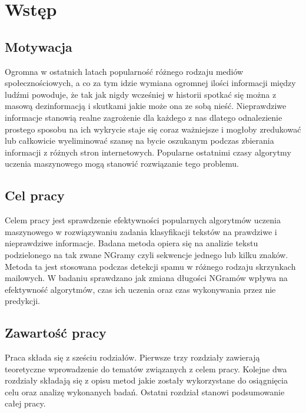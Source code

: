 \chapter*{Wstęp}
\section*{Motywacja}
Ogromna w ostatnich latach popularność różnego rodzaju mediów społecznościowych, a co za tym 
idzie wymiana ogromnej ilości informacji między ludźmi powoduje, że tak jak nigdy wcześniej 
w historii spotkać się można z masową dezinformacją i skutkami jakie może ona ze sobą nieść.
Nieprawdziwe informacje stanowią realne zagrożenie dla każdego z nas dlatego odnalezienie 
prostego sposobu na ich wykrycie staje się coraz ważniejsze i mogłoby 
zredukować lub całkowicie wyeliminować szansę na bycie oszukanym podczas zbierania
informacji z różnych stron internetowych. Popularne ostatnimi czasy algorytmy uczenia 
maszynowego mogą stanowić rozwiązanie tego problemu.
\section*{Cel pracy}
Celem pracy jest sprawdzenie efektywności popularnych algorytmów uczenia maszynowego w rozwiązywaniu 
zadania klasyfikacji tekstów na prawdziwe i nieprawdziwe informacje. Badana metoda opiera 
się na analizie tekstu podzielonego na tak zwane NGramy czyli sekwencje jednego lub kilku znaków.
Metoda ta jest stosowana podczas detekcji spamu w różnego rodzaju skrzynkach mailowych.
W badaniu sprawdzano jak zmiana długości NGramów wpływa na efektywność algorytmów, czas ich 
uczenia oraz czas wykonywania przez nie predykcji. 
\section*{Zawartość pracy}
Praca składa się z sześciu rodziałów. Pierwsze trzy rozdziały zawierają teoretyczne wprowadzenie 
do tematów związanych z celem pracy. Kolejne dwa rozdziały składają się z opisu metod jakie 
zostały wykorzystane do osiągnięcia celu oraz analizę wykonanych badań. Ostatni rozdział 
stanowi podsumowanie całej pracy.

